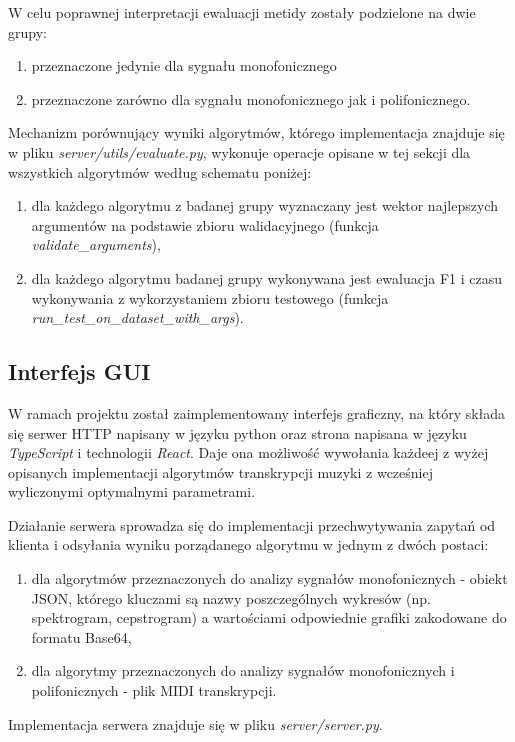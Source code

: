 \documentclass[12pt,a4paper,twoside]{mwart}
\begin{document}
W celu poprawnej interpretacji ewaluacji metidy zostały podzielone na dwie grupy:
\begin{enumerate}
  \item przeznaczone jedynie dla sygnału monofonicznego
  \item przeznaczone zarówno dla sygnału monofonicznego jak i polifonicznego.
\end{enumerate}
Mechanizm porównujący wyniki algorytmów, którego implementacja znajduje się w pliku \textit{server/utils/evaluate.py}, wykonuje operacje opisane w tej sekcji dla wszystkich algorytmów według schematu poniżej:
\begin{enumerate}
  \item dla każdego algorytmu z badanej grupy wyznaczany jest wektor najlepszych argumentów na podstawie zbioru walidacyjnego (funkcja \textit{validate\_arguments}),
  \item dla każdego algorytmu badanej grupy wykonywana jest ewaluacja F1 i czasu wykonywania z wykorzystaniem zbioru testowego (funkcja \textit{run\_test\_on\_dataset\_with\_args}).
\end{enumerate}


\subsection{Interfejs GUI}\label{sec:impl:gui}
W ramach projektu został zaimplementowany interfejs graficzny, na który składa się serwer HTTP napisany w języku python oraz strona napisana w języku \textit{TypeScript} i technologii \textit{React}. Daje ona możliwość wywołania każdeej z wyżej opisanych implementacji algorytmów transkrypcji muzyki z wcześniej wyliczonymi optymalnymi parametrami.

Działanie serwera sprowadza się do implementacji przechwytywania zapytań od klienta i odsyłania wyniku porządanego algorytmu w jednym z dwóch postaci:
\begin{enumerate}
  \item dla algorytmów przeznaczonych do analizy sygnałów monofonicznych - obiekt JSON, którego kluczami są nazwy poszczególnych wykresów (np. spektrogram, cepstrogram) a wartościami odpowiednie grafiki zakodowane do formatu Base64,
  \item dla algorytmy przeznaczonych do analizy sygnałów monofonicznych i polifonicznych - plik MIDI transkrypcji.
\end{enumerate} 
Implementacja serwera znajduje się w pliku \textit{server/server.py}.
\end{document}
